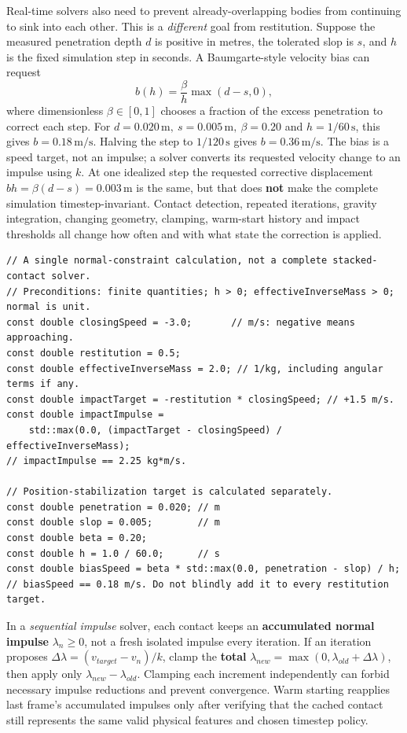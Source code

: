 Real-time solvers also need to prevent already-overlapping bodies from continuing to sink into each other. This is a \emph{different} goal from restitution. Suppose the measured penetration depth \(d\) is positive in metres, the tolerated slop is \(s\), and \(h\) is the fixed simulation step in seconds. A Baumgarte-style velocity bias can request \[
b(h)=\frac{\beta}{h}\max(d-s,0),
\] where dimensionless \(\beta\in[0,1]\) chooses a fraction of the excess penetration to correct each step. For \(d=0.020\,\mathrm m,\ s=0.005\,\mathrm m,\ \beta=0.20\) and \(h=1/60\,\mathrm s\), this gives \(b=0.18\,\mathrm{m/s}\). Halving the step to \(1/120\,\mathrm s\) gives \(b=0.36\,\mathrm{m/s}\). The bias is a speed target, not an impulse; a solver converts its requested velocity change to an impulse using \(k\). At one idealized step the requested corrective displacement \(bh=\beta(d-s)=0.003\,\mathrm m\) is the same, but that does \textbf{not} make the complete simulation timestep-invariant. Contact detection, repeated iterations, gravity integration, changing geometry, clamping, warm-start history and impact thresholds all change how often and with what state the correction is applied.

\begin{verbatim}
// A single normal-constraint calculation, not a complete stacked-contact solver.
// Preconditions: finite quantities; h > 0; effectiveInverseMass > 0; normal is unit.
const double closingSpeed = -3.0;       // m/s: negative means approaching.
const double restitution = 0.5;
const double effectiveInverseMass = 2.0; // 1/kg, including angular terms if any.
const double impactTarget = -restitution * closingSpeed; // +1.5 m/s.
const double impactImpulse =
    std::max(0.0, (impactTarget - closingSpeed) / effectiveInverseMass);
// impactImpulse == 2.25 kg*m/s.

// Position-stabilization target is calculated separately.
const double penetration = 0.020; // m
const double slop = 0.005;        // m
const double beta = 0.20;
const double h = 1.0 / 60.0;      // s
const double biasSpeed = beta * std::max(0.0, penetration - slop) / h;
// biasSpeed == 0.18 m/s. Do not blindly add it to every restitution target.
\end{verbatim}

In a \emph{sequential impulse} solver, each contact keeps an \textbf{accumulated normal impulse} \(\lambda_n\geq0\), not a fresh isolated impulse every iteration. If an iteration proposes \(\Delta\lambda=(v_{target}-v_n)/k\), clamp the \textbf{total} \(\lambda_{new}=\max(0,\lambda_{old}+\Delta\lambda)\), then apply only \(\lambda_{new}-\lambda_{old}\). Clamping each increment independently can forbid necessary impulse reductions and prevent convergence. Warm starting reapplies last frame's accumulated impulses only after verifying that the cached contact still represents the same valid physical features and chosen timestep policy.

